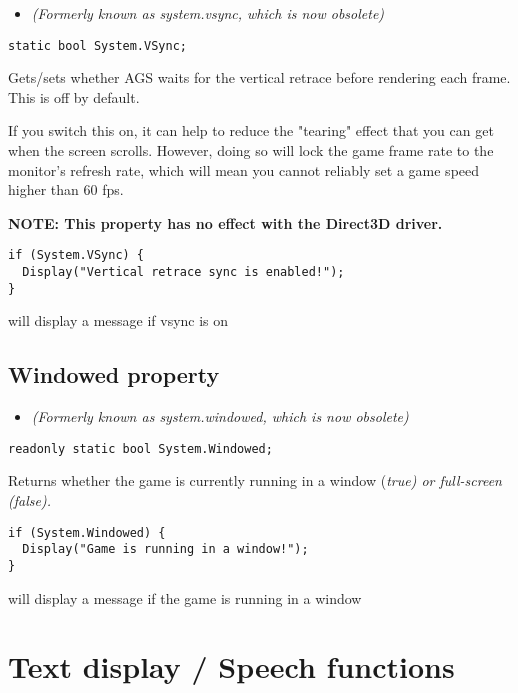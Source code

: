 \begin{itemize}
\item \it{(Formerly known as system.vsync, which is now obsolete)}
\end{itemize}

\begin{verbatim}
static bool System.VSync;
\end{verbatim}
Gets/sets whether AGS waits for the vertical retrace before rendering each frame.
This is off by default.

If you switch this on, it can help to reduce the "tearing" effect that you can
get when the screen scrolls. However, doing so will lock the game frame rate to
the monitor's refresh rate, which will mean you cannot reliably set a game speed higher
than 60 fps.

\bf{NOTE:} This property has no effect with the Direct3D driver.

\begin{verbatim}
if (System.VSync) {
  Display("Vertical retrace sync is enabled!");
}
\end{verbatim}
will display a message if vsync is on


\subsection{Windowed property}\label{System.Windowed}%

\begin{itemize}
\item \it{(Formerly known as system.windowed, which is now obsolete)}
\end{itemize}

\begin{verbatim}
readonly static bool System.Windowed;
\end{verbatim}
Returns whether the game is currently running in a window (\it{true}) or
full-screen (\it{false}).

\begin{verbatim}
if (System.Windowed) {
  Display("Game is running in a window!");
}
\end{verbatim}
will display a message if the game is running in a window




\section{Text display / Speech functions}%

